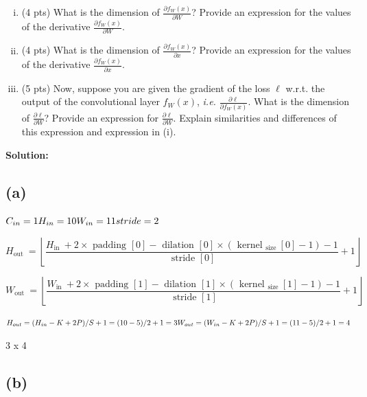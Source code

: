 \begin{enumerate}[(a)]
\begin{enumerate}[(i)]
    
    \item (4 pts) What is the dimension of $\frac {\partial f_W(x)}{\partial W}$? Provide an expression for the values of the derivative $\frac {\partial f_W(x)}{\partial W}$. 

    \item (4 pts) What is the dimension of $\frac {\partial f_W(x)}{\partial x}$? Provide an expression for the values of the derivative $\frac {\partial f_W(x)}{\partial x}$. 
    
    \item (5 pts) Now, suppose you are given the gradient of the loss $\ell$ w.r.t. the output of the convolutional layer $f_W(x)$, \emph{i.e.} 
    $\frac {\partial \ell}{\partial f_W(x)}$. What is the dimension of $\frac {\partial \ell}{\partial W}$? Provide an expression for $ \frac {\partial \ell}{\partial W}$. Explain similarities and differences of this expression and expression in (i).
\end{enumerate}

\textbf{Solution:}

\subsection*{(a)}

$
C_{in} = 1\\
H_{in} = 10\\
W_{in} = 11\\
stride = 2
$

\begin{equation}
    H_{\text {out }}=\left\lfloor\frac{H_{\text {in }}+2 \times \text { padding }[0]-\text { dilation }[0] \times\left(\text { kernel }_{\text {size }}[0]-1\right)-1}{\text { stride }[0]}+1\right\rfloor 
\end{equation}

\begin{equation}
    W_{\text {out }}=\left\lfloor\frac{W_{\text {in }}+2 \times \text { padding }[1]-\text { dilation }[1] \times\left(\text { kernel }_{\text {size }}[1]-1\right)-1}{\text { stride }[1]}+1\right\rfloor 
\end{equation}


$
H_{out} = (H_{in} - K + 2P)/S + 1 = (10 - 5)/2 + 1 = 3 \\
W_{out} = (W_{in} - K + 2P)/S + 1 = (11 - 5)/2 + 1 = 4
$


3 x 4

\subsection*{(b)}



\end{enumerate}
